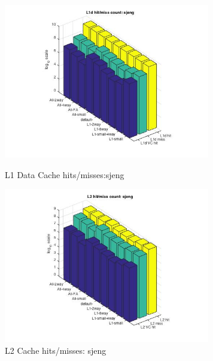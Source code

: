 \documentclass[11pt,titlepage]{article}
\begin{document}
          \begin{figure}[H]
          \centering
          \begin{minipage}{.45\textwidth}
            \centering
            \includegraphics[width=9cm]{L1DHM_sjeng}
            \caption{L1 Data Cache hits/misses:sjeng}
            \label{fig:L1DHM_sjeng}
          \end{minipage}
          \begin{minipage}{.45\textwidth}
            \centering
            \includegraphics[width=9cm]{L2HM_sjeng}
            \caption{L2 Cache hits/misses: sjeng}
            \label{fig:L2HM_sjeng}
          \end{minipage}
    \end{figure}
\pagebreak
\end{document}
